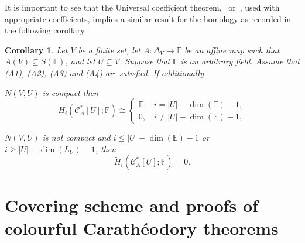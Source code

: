 \documentclass[a4paper,11pt,reqno, english]{amsart}
\newtheorem{corollary}[theorem]{Corollary}
\theoremstyle{definition}
\theoremstyle{remark}
\newcommand\FF{\mathbb F}
\newcommand\CC{\mathscr C}
\newcommand\E{\mathbb{E}}
\begin{document}
\medskip
It is important to see that the Universal coefficient theorem,~\cite[Cor.\,V.7.2]{Bredon2010} or~\cite[Cor.\,53.6]{Munkres1984}, used with appropriate coefficients, implies a similar result for the homology as recorded in the following corollary.

\medskip
\begin{corollary}
	\label{cor : topology of induced sub-complexes 09 }
	Let $V$ be a finite set, let $A\colon \Delta_V\longrightarrow\E$ be an affine map such that $A(V)\subseteq S(\E)$, and let $U\subseteq V$.
	Suppose that $\FF$ is an arbitrary field.
	Assume that {\rm (A1)}, {\rm (A2)}, {\rm (A3)} and  {\rm (A4)} are satisfied.
	If additionally
	\begin{compactenum}[\rm \quad (1)]
		\item  $N(V,U)$ is compact then
		\begin{equation}
			\label{eq : dual of dual 08 - 11}
			\widetilde{H}_i(\CC_A^*[U];\FF)\cong
			\begin{cases}
				\FF, & i=|U|-\dim(\E)-1,     \\
				0,   & i\neq |U|-\dim(\E)-1,
			\end{cases}
		\end{equation}

		\item $N(V,U)$ is not compact and $i\leq |U|-\dim(\E)-1$ or $i\geq |U|-\dim(L_U)-1$, then
		\begin{equation}
			\label{eq : dual of dual 08 - 21}
			\widetilde{H}_i(\CC_A^*[U];\FF)= 0.
		\end{equation}
	\end{compactenum}
\end{corollary}



\bigskip
\section{Covering scheme and proofs of colourful Carath\'eodory theorems}
\label{sec : Covering scheme and proofs of colourful Caratheodory theorems}
\bigskip
\end{document}
